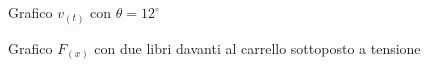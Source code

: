 \documentclass[a4paper]{article}
\theoremstyle{definition}
\begin{document}
\begin{figure}[!ht]
	\captionsetup{labelformat=empty}
	\caption{Grafico \(v_{(t)}\) con \(\theta = 12^{\circ}\)}
	
\end{figure}
\begin{figure}[!ht]
	\captionsetup{labelformat=empty}
	\caption{Grafico \(F_{(x)}\) con due libri davanti al carrello sottoposto a tensione}
	
\end{figure}
\end{document}
